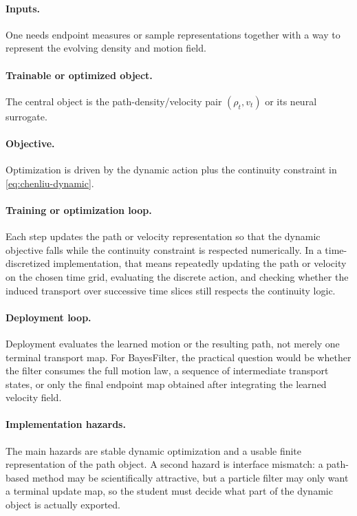 \documentclass[11pt]{report}
\begin{document}
\paragraph{Inputs.}
One needs endpoint measures or sample representations together with a way to
represent the evolving density and motion field.

\paragraph{Trainable or optimized object.}
The central object is the path-density/velocity pair $(\rho_t,v_t)$ or its neural
surrogate.

\paragraph{Objective.}
Optimization is driven by the dynamic action plus the continuity constraint in
\eqref{eq:chenliu-dynamic}.

\paragraph{Training or optimization loop.}
Each step updates the path or velocity representation so that the dynamic objective
falls while the continuity constraint is respected numerically.  In a time-discretized
implementation, that means repeatedly updating the path or velocity on the chosen time
grid, evaluating the discrete action, and checking whether the induced transport over
successive time slices still respects the continuity logic.

\paragraph{Deployment loop.}
Deployment evaluates the learned motion or the resulting path, not merely one
terminal transport map.  For BayesFilter, the practical question would be whether the
filter consumes the full motion law, a sequence of intermediate transport states, or
only the final endpoint map obtained after integrating the learned velocity field.

\paragraph{Implementation hazards.}
The main hazards are stable dynamic optimization and a usable finite representation
of the path object.  A second hazard is interface mismatch: a path-based method may be
scientifically attractive, but a particle filter may only want a terminal update map,
so the student must decide what part of the dynamic object is actually exported.
\end{document}
